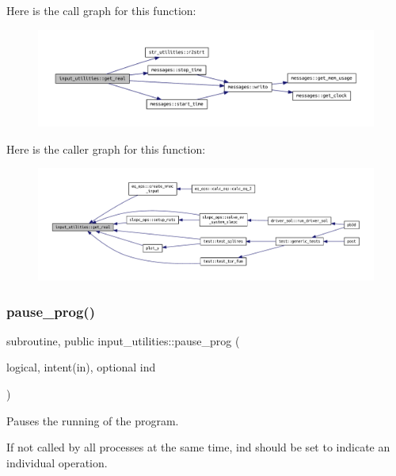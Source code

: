 Here is the call graph for this function\+:\nopagebreak
\begin{figure}[H]
\begin{center}
\leavevmode
\includegraphics[width=350pt]{namespaceinput__utilities_a41fc0c806e12bc722771210cfa1edbd3_cgraph}
\end{center}
\end{figure}
Here is the caller graph for this function\+:\nopagebreak
\begin{figure}[H]
\begin{center}
\leavevmode
\includegraphics[width=350pt]{namespaceinput__utilities_a41fc0c806e12bc722771210cfa1edbd3_icgraph}
\end{center}
\end{figure}
\mbox{\label{namespaceinput__utilities_a71bd36f063d55ab62c7a37864aef1185}} 
\subsubsection{\texorpdfstring{pause\+\_\+prog()}{pause\_prog()}}
{\footnotesize\ttfamily subroutine, public input\+\_\+utilities\+::pause\+\_\+prog (\begin{DoxyParamCaption}\item[{logical, intent(in), optional}]{ind }\end{DoxyParamCaption})}



Pauses the running of the program. 

If not called by all processes at the same time, {\ttfamily ind} should be set to indicate an individual operation. 

